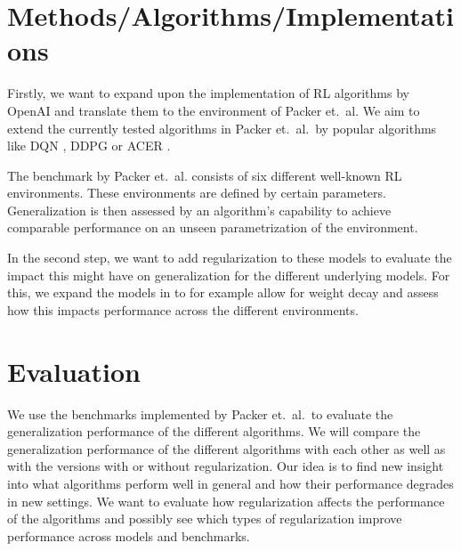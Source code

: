 \documentclass{article}
\begin{document}
\section{Methods/Algorithms/Implementations}
Firstly, we want to expand upon the implementation of RL algorithms by OpenAI \cite{baselines} and translate them to the environment of Packer et.\ al. We aim to extend the currently tested algorithms in Packer et.\ al.\ by popular algorithms like DQN \cite{dqn_paper}, DDPG \cite{lillicrap2019continuous} or ACER \cite{wang2017sample}.

The benchmark by Packer et.\ al. consists of six different well-known RL environments. These environments are defined by certain parameters. Generalization is then assessed by an algorithm's capability to achieve comparable performance on an unseen parametrization of the environment. 

In the second step, we want to add regularization to these models to evaluate the impact this might have on generalization for the different underlying models.
For this, we expand the models in \cite{baselines} to for example allow for weight decay and assess how this impacts performance across the different environments.
\section{Evaluation}
We use the benchmarks implemented by Packer et.\ al.\ to evaluate the generalization performance of the different algorithms. 
We will compare the generalization performance of the different algorithms with each other as well as with the versions with or without regularization. Our idea is to find new insight into what algorithms perform well in general and how their performance degrades in new settings. We want to evaluate how regularization affects the performance of the algorithms and possibly see which types of regularization improve performance across models and benchmarks.

\medskip




\iffalse
Generalization and Regularization in DQN \url{https://arxiv.org/abs/1810.00123}

In case we want to include a new (2021) RL algo that focuses on generalization: \url{http://proceedings.mlr.press/v139/raileanu21a.html}
\fi
\end{document}

